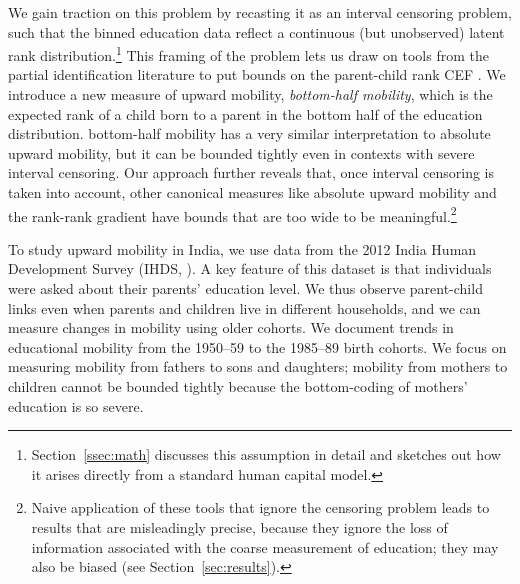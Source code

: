 \documentclass[12pt,letterpaper]{article}
\numberwithin{equation}{section}
\begin{document}
We gain traction on this problem by recasting it as an interval censoring problem, such that the binned education data reflect a continuous (but unobserved) latent rank distribution.\footnote{Section~\ref{ssec:math} discusses this assumption in detail and sketches out how it arises directly from a standard human capital model.} This framing of the problem lets us draw on tools from the partial identification literature to put bounds on the parent-child rank CEF \cite{manski2002,nra2020mort}. We introduce a new measure of upward mobility, \textit{bottom-half mobility}, which is the expected rank of a child born to a parent in the bottom half of the education distribution. bottom-half mobility has a very similar interpretation to absolute upward mobility, but it can be bounded tightly even in contexts with severe interval censoring. Our approach further reveals that, once interval censoring is taken into account, other canonical measures like absolute upward mobility and the rank-rank gradient have bounds that are too wide to be meaningful.\footnote{Naive application of these tools that ignore the censoring problem leads to results that are misleadingly precise, because they ignore the loss of information associated with the coarse measurement of education; they may also be biased (see Section~\ref{sec:results}).}

To study upward mobility in India, we use data from the 2012 India Human Development Survey (IHDS, ). A key feature of this dataset is that individuals were asked about their parents' education level. We thus observe parent-child links even when parents and children live in different households, and we can measure changes in mobility using older cohorts. We document trends in educational mobility from the 1950--59 to the 1985--89 birth cohorts. We focus on measuring mobility from fathers to sons and daughters; mobility from mothers to children cannot be bounded tightly because the bottom-coding of mothers' education is so severe.
\end{document}
